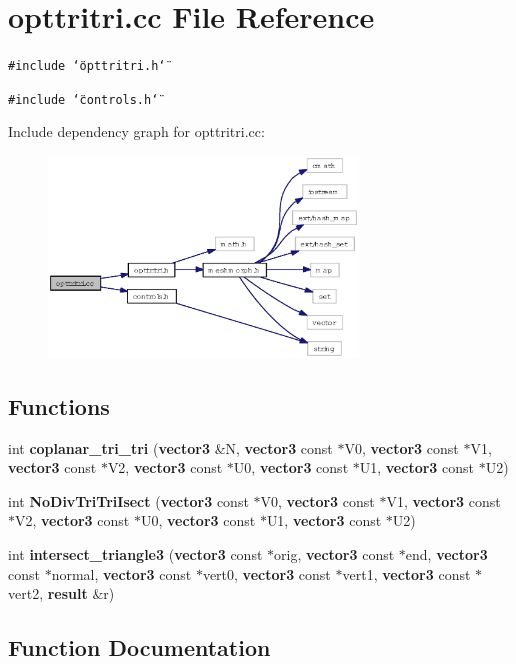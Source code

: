 \section{opttritri.cc File Reference}
\label{opttritri_8cc}
{\tt \#include \char`\"{}opttritri.h\char`\"{}}\par
{\tt \#include \char`\"{}controls.h\char`\"{}}\par


Include dependency graph for opttritri.cc:\begin{figure}[H]
\begin{center}
\leavevmode
\includegraphics[width=233pt]{opttritri_8cc__incl}
\end{center}
\end{figure}
\subsection*{Functions}
\begin{CompactItemize}
\item 
int {\bf coplanar\_\-tri\_\-tri} ({\bf vector3} \&N, {\bf vector3} const $\ast$V0, {\bf vector3} const $\ast$V1, {\bf vector3} const $\ast$V2, {\bf vector3} const $\ast$U0, {\bf vector3} const $\ast$U1, {\bf vector3} const $\ast$U2)
\item 
int {\bf No\-Div\-Tri\-Tri\-Isect} ({\bf vector3} const $\ast$V0, {\bf vector3} const $\ast$V1, {\bf vector3} const $\ast$V2, {\bf vector3} const $\ast$U0, {\bf vector3} const $\ast$U1, {\bf vector3} const $\ast$U2)
\item 
int {\bf intersect\_\-triangle3} ({\bf vector3} const $\ast$orig, {\bf vector3} const $\ast$end, {\bf vector3} const $\ast$normal, {\bf vector3} const $\ast$vert0, {\bf vector3} const $\ast$vert1, {\bf vector3} const $\ast$vert2, {\bf result} \&r)
\end{CompactItemize}


\subsection{Function Documentation}
